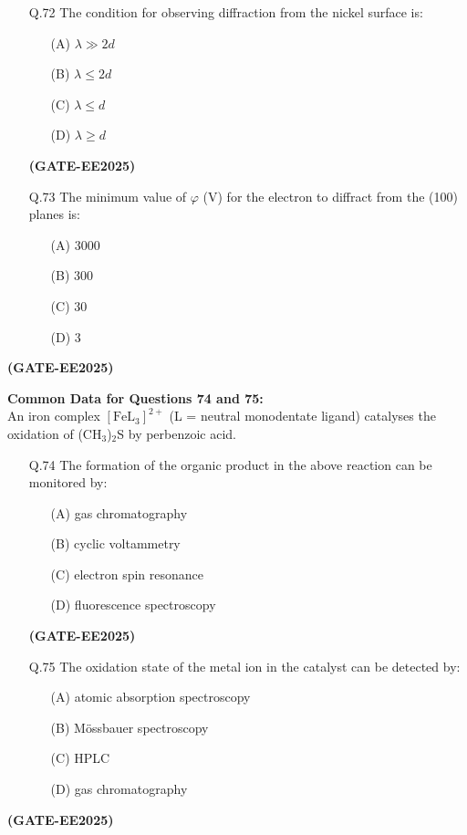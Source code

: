 \documentclass[12pt]{article}
\begin{document}
\begin{enumerate}
\begin{itemize}
    \item[Q.72] The condition for observing diffraction from the nickel surface is:
    \begin{enumerate}
        \item[(A)] $\lambda \gg 2d$
        \item[(B)] $\lambda \leq 2d$
        \item[(C)] $\lambda \leq d$
        \item[(D)] $\lambda \geq d$
    \end{enumerate}   \textbf{(GATE-EE2025)}


    \item[Q.73] The minimum value of $\varphi$ (V) for the electron to diffract from the (100) planes is:
    \begin{enumerate}
        \item[(A)] 3000
        \item[(B)] 300
        \item[(C)] 30
        \item[(D)] 3
    \end{enumerate}
\end{itemize}   \textbf{(GATE-EE2025)}


\textbf{Common Data for Questions 74 and 75:} \\
An iron complex $[\text{FeL}_3]^{2+}$ (L = neutral monodentate ligand) catalyses the oxidation of (CH$_3$)$_2$S by perbenzoic acid.

\begin{itemize}
    \item[Q.74] The formation of the organic product in the above reaction can be monitored by:
    \begin{enumerate}
        \item[(A)] gas chromatography
        \item[(B)] cyclic voltammetry
        \item[(C)] electron spin resonance
        \item[(D)] fluorescence spectroscopy
    \end{enumerate}   \textbf{(GATE-EE2025)}


    \item[Q.75] The oxidation state of the metal ion in the catalyst can be detected by:
    \begin{enumerate}
        \item[(A)] atomic absorption spectroscopy
        \item[(B)] M\"ossbauer spectroscopy
        \item[(C)] HPLC
        \item[(D)] gas chromatography
    \end{enumerate}
\end{itemize}   \textbf{(GATE-EE2025)}



\end{enumerate}
\end{document}
